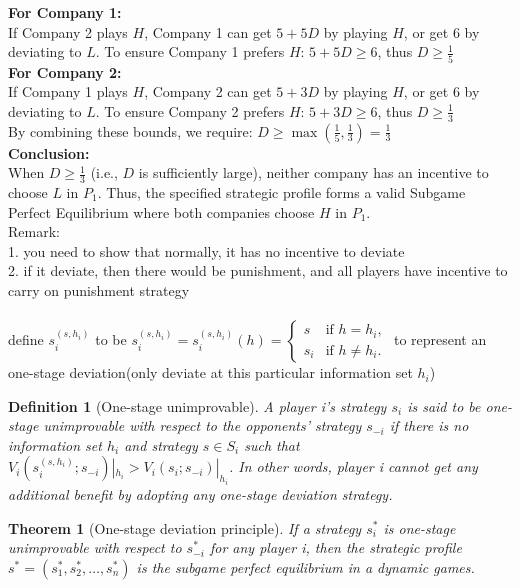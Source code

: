\documentclass[twoside]{article}
\theoremstyle{definitionstyle}
\newtheorem*{definition}{Definition}
\newtheorem*{theorem}{Theorem}
\begin{document}
\textbf{For Company 1:}\\
If Company 2 plays $H$, Company 1 can get $5 + 5D$ by playing $H$, or get $6$ by deviating to $L$. To ensure Company 1 prefers $H$:
$5 + 5D \ge 6$, thus $D \ge \frac{1}{5}$\\
\textbf{For Company 2:}\\
If Company 1 plays $H$, Company 2 can get $5 + 3D$ by playing $H$, or get $6$ by deviating to $L$. To ensure Company 2 prefers $H$:
$5 + 3D \ge 6$, thus $D \ge \frac{1}{3}$ \\
By combining these bounds, we require:
$D \ge \max\left( \frac{1}{5}, \frac{1}{3} \right) = \frac{1}{3}$\\
\newline
\textbf{Conclusion:}\\
When $D \ge \frac{1}{3}$ (i.e., $D$ is sufficiently large), neither company has an incentive to choose $L$ in $P_1$. Thus, the specified strategic profile forms a valid Subgame Perfect Equilibrium where both companies choose $H$ in $P_1$.\\
\newline
%
%
%
Remark:\\
1. you need to show that normally, it has no incentive to deviate\\
2. if it deviate, then there would be punishment, and all players have incentive to carry on punishment strategy\\
\text{***}\\
define $s_i^{(s,h_i)}$ to be $s_i^{(s,h_i)} = s_i^{(s, h_i)}(h) = 
\begin{cases} 
s & \text{if } h = h_i, \\ 
s_i & \text{if } h \neq h_i. 
\end{cases}$ to represent an one-stage deviation(only deviate at this particular information set $h_i$)
\begin{definition}[One-stage unimprovable]
  A player i's strategy $s_i$ is said to be one-stage unimprovable with respect to the opponents' strategy $s_{-i}$ if there is no information set $h_i$ and 
strategy $s\in S_i$ such that $V_i(s_i^{(s,h_i)}; s_{-i})|_{h_i}>V_i(s_i; s_{-i})|_{h_i}$. In other words, player i cannot get any additional benefit by adopting any one-stage deviation strategy. 
\end{definition}
\begin{theorem}[One-stage deviation principle]
  If a strategy $s_i^*$ is one-stage unimprovable with respect to $s_{-i}^*$ for any player i, then the strategic profile $s^* = (s_1^*, s_2^*, \ldots, s_n^*)$ is the subgame perfect equilibrium in a dynamic games. 
\end{theorem}
\end{document}
